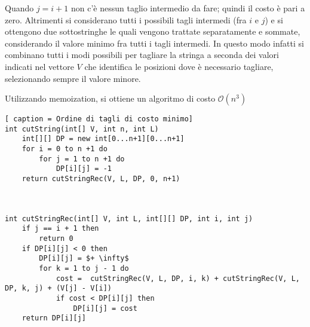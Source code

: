 \documentclass[../cheatSheetAlgoritmi.tex]{subfiles}
\begin{document}
Quando $j = i + 1$ non c'è nessun taglio intermedio da fare; quindi il costo è pari a zero. Altrimenti si considerano tutti i possibili tagli intermedi (fra $i$ e $j$) e si ottengono due sottostringhe le quali vengono trattate separatamente e sommate, considerando il valore minimo fra tutti i tagli intermedi. In questo modo infatti si combinano tutti i modi possibili per tagliare la stringa a seconda dei valori indicati nel vettore $V$ che identifica le posizioni dove è necessario tagliare, selezionando sempre il valore minore. 

Utilizzando memoization, si ottiene un algoritmo di costo $\mathcal{O}(n^3)$
\newpage
\begin{lstlisting}[ caption = Ordine di tagli di costo minimo]
int cutString(int[] V, int n, int L)
	int[][] DP = new int[0...n+1][0...n+1]
	for i = 0 to n +1 do
		for j = 1 to n +1 do
			DP[i][j] = -1
	return cutStringRec(V, L, DP, 0, n+1)



int cutStringRec(int[] V, int L, int[][] DP, int i, int j)
	if j == i + 1 then
		return 0
	if DP[i][j] < 0 then
		DP[i][j] = $+ \infty$
		for k = 1 to j - 1 do
			cost =  cutStringRec(V, L, DP, i, k) + cutStringRec(V, L, DP, k, j) + (V[j] - V[i])
			if cost < DP[i][j] then
				DP[i][j] = cost
	return DP[i][j]
\end{lstlisting}
\newpage
\end{document}

